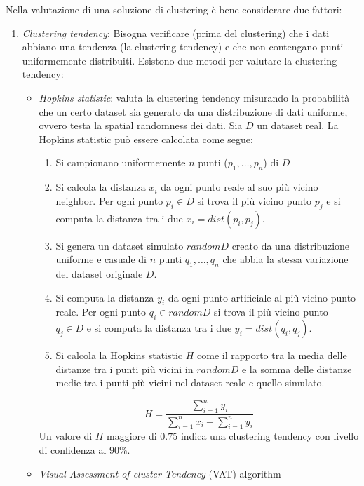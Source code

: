 Nella valutazione di una soluzione di clustering è bene considerare due fattori:
\begin{enumerate}
    \item \textit{Clustering tendency}: Bisogna verificare (prima del clustering) che i dati abbiano una tendenza (la clustering tendency) e che non contengano punti uniformemente distribuiti. Esistono due metodi per valutare la clustering tendency: 
        \begin{itemize}
            \item \textit{Hopkins statistic}: valuta la clustering tendency misurando la probabilità che un certo dataset sia generato da una distribuzione di dati uniforme, ovvero testa la spatial randomness dei dati. Sia $D$ un dataset real. La Hopkins statistic può essere calcolata come segue:
                \begin{enumerate}
                    \item Si campionano uniformemente $n$ punti ($p_1, \dots, p_n$) di $D$
                    \item  Si calcola la distanza $x_i$ da ogni punto reale al suo più vicino neighbor. 
                        Per ogni punto $p_i \in D$ si trova il più vicino punto $p_j$ e si computa la distanza tra i due $x_i = dist(p_i, p_j)$.
                    \item  Si genera un dataset simulato $randomD$ creato da una distribuzione uniforme e casuale di $n$ punti $q_1, \dots, q_n$ che abbia la stessa variazione del dataset originale $D$.
                    \item Si computa la distanza $y_i$ da ogni punto artificiale al più vicino punto reale.
                        Per ogni punto $q_i \in randomD$ si trova il più vicino punto $q_j \in D$ e si computa la distanza tra i due $y_i = dist(q_i, q_j)$.
                    \item Si calcola la Hopkins statistic $H$ come il rapporto tra la media delle distanze tra i punti più vicini in $randomD$ e la somma delle distanze medie tra i punti più vicini nel dataset reale e quello simulato.
                \end{enumerate}
                    \[\displaystyle H =  \displaystyle \frac{\displaystyle\sum_{i=1}^n{y_i}}{\displaystyle\sum_{i=1}^n{x_i} + \displaystyle\sum_{i=1}^n{y_i}} \]
            Un valore di $H$ maggiore di $0.75$ indica una clustering tendency con livello di confidenza al $90\%$.
            \item \textit{ Visual Assessment of cluster Tendency} (VAT) algorithm

\end{itemize}
\end{enumerate}
